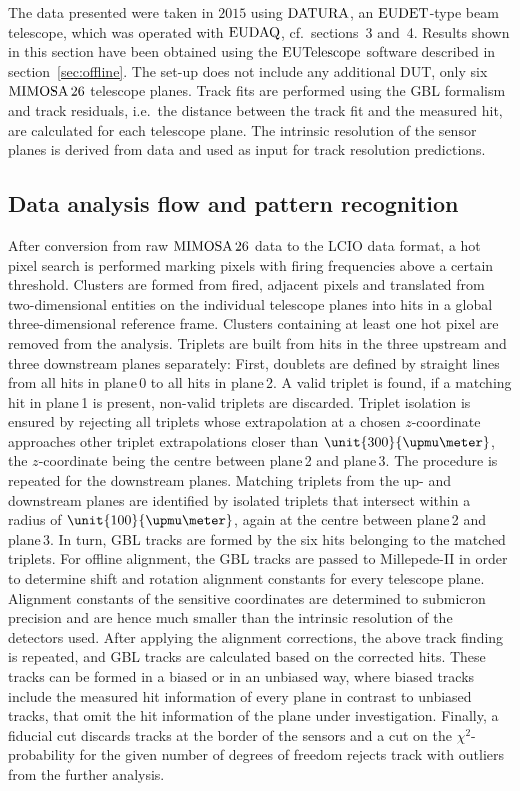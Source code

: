 
The data presented were taken in $2015$ using $\textrm{DATURA}$, an $\textrm{EUDET}$-type beam telescope, which was operated with $\textrm{EUDAQ}$, cf.~sections~3 and~4. 
Results shown in this section have been obtained using the $\textrm{EUTelescope}$ software described in section~\ref{sec:offline}. 
The set-up does not include any additional DUT, only six $\textrm{MIMOSA\,26}$ telescope planes. 
Track fits are performed using the GBL formalism and track residuals, i.e.\ the distance between the track fit and the measured hit,
 are calculated for each telescope plane. 
The intrinsic resolution of the sensor planes is derived from data and used as input for track resolution predictions. 
 

\subsection{Data analysis flow and pattern recognition}
\label{sec:datura-nodut}

After conversion from raw $\textrm{MIMOSA\,26}$ data to the LCIO data format, a hot pixel search is performed marking pixels with firing frequencies above a certain threshold.
Clusters are formed from fired, adjacent pixels and translated from two-dimensional entities on the individual telescope planes into hits in a global three-dimensional reference frame.
Clusters containing at least one hot pixel are removed from the analysis. 
Triplets are built from hits in the three upstream and three downstream planes separately: 
First, doublets are defined by straight lines from all hits in plane\,0 to all hits in plane\,2. 
A valid triplet is found, if a matching hit in plane\,1 is present, non-valid triplets are discarded.  
Triplet isolation is ensured by rejecting all triplets whose extrapolation at a chosen $z$-coordinate approaches other triplet extrapolations closer than $\unit{300}{\upmu\meter}$,
 the $z$-coordinate being the centre between plane\,2 and plane\,3. 
The procedure is repeated for the downstream planes. 
Matching triplets from the up- and downstream planes are identified by isolated triplets that intersect within a radius of $\unit{100}{\upmu\meter}$, again at the centre between plane\,2 and plane\,3. 
In turn, GBL tracks are formed by the six hits belonging to the matched triplets. 
For offline alignment, the GBL tracks are passed to \mbox{Millepede-II} in order to determine shift and rotation alignment constants for every telescope plane.
Alignment constants of the sensitive coordinates are determined to submicron precision and are hence much smaller than the intrinsic resolution of the detectors used. 
After applying the alignment corrections, the above track finding is repeated, and GBL tracks are calculated based on the corrected hits. 
These tracks can be formed in a \textrm{biased} or in an \textrm{unbiased} way, where biased tracks include the measured hit information of every plane in contrast to unbiased tracks,
 that omit the hit information of the plane under investigation. 
Finally, a fiducial cut discards tracks at the border of the sensors and a cut on the $\chi^2$-probability for the given number of degrees of freedom rejects track with outliers from the further analysis. 

